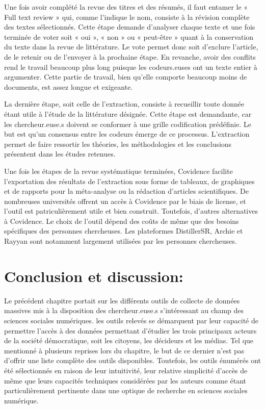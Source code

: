 \documentclass[
  letterpaper,
]{scrbook}
\begin{document}
Une fois avoir complété la revue des titres et des résumés, il faut
entamer le « Full text review » qui, comme l'indique le nom, consiste à
la révision complète des textes sélectionnés. Cette étape demande
d'analyser chaque texte et une fois terminée de voter soit « oui », «
non » ou « peut-être » quant à la conservation du texte dans la revue de
littérature. Le vote permet donc soit d'exclure l'article, de le retenir
ou de l'envoyer à la prochaine étape. En revanche, avoir des conflits
rend le travail beaucoup plus long puisque les codeurs.euses ont un
texte entier à argumenter. Cette partie de travail, bien qu'elle
comporte beaucoup moins de documents, est assez longue et exigeante.

La dernière étape, soit celle de l'extraction, consiste à recueillir
toute donnée étant utile à l'étude de la littérature désignée. Cette
étape est demandante, car les chercheur.euse.s doivent se conformer à
une grille codification prédéfinie. Le but est qu'un consensus entre les
codeurs émerge de ce processus. L'extraction permet de faire ressortir
les théories, les méthodologies et les conclusions présentent dans les
études retenues.

Une fois les étapes de la revue systématique terminées, Covidence
facilite l'exportation des résultats de l'extraction sous forme de
tableaux, de graphiques et de rapports pour la méta-analyse ou la
rédaction d'articles scientifiques. De nombreuses universités offrent un
accès à Covidence par le biais de license, et l'outil est
patriculièrement utile et bien construit. Toutefois, d'autres
alternatives à Covidence. Le choix de l'outil dépend des coûts de même
que des besoins spécifiques des personnes chercheuses. Les plateformes
DistillerSR, Archie et Rayyan sont notamment largement utilisées par les
personnes chercheuses.

\hypertarget{conclusion-et-discussion}{%
\section{Conclusion et discussion:}\label{conclusion-et-discussion}}

Le précédent chapitre portait sur les différents outils de collecte de
données massives mis à la disposition des chercheur.euse.s s'intéressant
au champ des sciences sociales numériques. les outils relevés se
démarquent par leur capacité de permettre l'accès à des données
permettant d'étudier les trois principaux acteurs de la société
démocratique, soit les citoyens, les décideurs et les médias. Tel que
mentionné à plusieurs reprises lors du chapitre, le but de ce dernier
n'est pas d'offrir une liste complète des outils disponibles. Toutefois,
les outils énumérés ont été sélectionnés en raison de leur intuitivité,
leur relative simplicité d'accès de même que leurs capacités techniques
considérées par les auteurs comme étant particulièrement pertinente dans
une optique de recherche en sciences sociales numérique.
\end{document}
